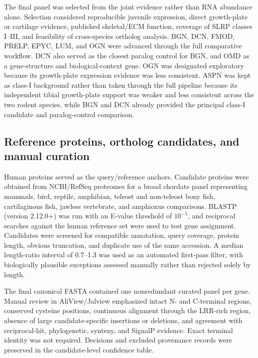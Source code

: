 The final panel was selected from the joint evidence rather than RNA abundance
alone. Selection considered reproducible juvenile expression, direct
growth-plate or cartilage evidence, published skeletal/ECM function, coverage of
SLRP classes I--III, and feasibility of cross-species ortholog analysis. BGN,
DCN, FMOD, PRELP, EPYC, LUM, and OGN were advanced through the full comparative
workflow. DCN also served as the closest paralog control for BGN, and OMD as a
gene-structure and biological-context gene. OGN was designated exploratory
because its growth-plate expression evidence was less consistent. ASPN was kept
as class-I background rather than taken through the full pipeline because its
independent tibial growth-plate support was weaker and less consistent across
the two rodent species, while BGN and DCN already provided the principal
class-I candidate and paralog-control comparison.

\subsection{Reference proteins, ortholog candidates, and manual curation}
\label{subsec:ortholog-search-filtering}

Human proteins served as the query/reference anchors. Candidate proteins were
obtained from NCBI/RefSeq proteomes for a broad chordate panel representing
mammals, bird, reptile, amphibian, teleost and non-teleost bony fish,
cartilaginous fish, jawless vertebrate, and amphioxus comparisons. BLASTP
(version 2.12.0+) was run with an E-value threshold of $10^{-5}$, and reciprocal
searches against the human reference set were used to test gene assignment.
Candidates were screened for compatible annotation, query coverage, protein
length, obvious truncation, and duplicate use of the same accession. A median
length-ratio interval of 0.7--1.3 was used as an automated first-pass filter,
with biologically plausible exceptions assessed manually rather than rejected
solely by length.

The final canonical FASTA contained one nonredundant curated panel per gene.
Manual review in AliView/Jalview emphasized intact N- and C-terminal regions,
conserved cysteine positions, continuous alignment through the LRR-rich region,
absence of large candidate-specific insertions or deletions, and agreement with
reciprocal-hit, phylogenetic, synteny, and SignalP evidence. Exact terminal
identity was not required. Decisions and excluded provenance records were
preserved in the candidate-level confidence table.

